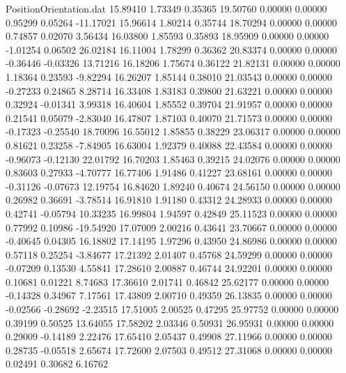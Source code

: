 \begin{filecontents}{PositionOrientation.dat}
  15.89410    1.73349    0.35365    19.50760    0.00000    0.00000    0.95299    0.05264  -11.17021
  15.96614    1.80214    0.35744    18.70294    0.00000    0.00000    0.74857    0.02070    3.56434
  16.03800    1.85593    0.35893    18.95909    0.00000    0.00000   -1.01254    0.06502   26.02184
  16.11004    1.78299    0.36362    20.83374    0.00000    0.00000   -0.36446   -0.03326   13.71216
  16.18206    1.75674    0.36122    21.82131    0.00000    0.00000    1.18364    0.23593   -9.82294
  16.26207    1.85144    0.38010    21.03543    0.00000    0.00000   -0.27233    0.24865    8.28714
  16.33408    1.83183    0.39800    21.63221    0.00000    0.00000    0.32924   -0.01341    3.99318
  16.40604    1.85552    0.39704    21.91957    0.00000    0.00000    0.21541    0.05079   -2.83040
  16.47807    1.87103    0.40070    21.71573    0.00000    0.00000   -0.17323   -0.25540   18.70096
  16.55012    1.85855    0.38229    23.06317    0.00000    0.00000    0.81621    0.23258   -7.84905
  16.63004    1.92379    0.40088    22.43584    0.00000    0.00000   -0.96073   -0.12130   22.01792
  16.70203    1.85463    0.39215    24.02076    0.00000    0.00000    0.83603    0.27933   -4.70777
  16.77406    1.91486    0.41227    23.68161    0.00000    0.00000   -0.31126   -0.07673   12.19754
  16.84620    1.89240    0.40674    24.56150    0.00000    0.00000    0.26982    0.36691   -3.78514
  16.91810    1.91180    0.43312    24.28933    0.00000    0.00000    0.42741   -0.05794   10.33235
  16.99804    1.94597    0.42849    25.11523    0.00000    0.00000    0.77992    0.10986  -19.54920
  17.07009    2.00216    0.43641    23.70667    0.00000    0.00000   -0.40645    0.04305   16.18802
  17.14195    1.97296    0.43950    24.86986    0.00000    0.00000    0.57118    0.25254   -3.84677
  17.21392    2.01407    0.45768    24.59299    0.00000    0.00000   -0.07209    0.13530    4.55841
  17.28610    2.00887    0.46744    24.92201    0.00000    0.00000    0.10681    0.01221    8.74683
  17.36610    2.01741    0.46842    25.62177    0.00000    0.00000   -0.14328    0.34967    7.17561
  17.43809    2.00710    0.49359    26.13835    0.00000    0.00000   -0.02566   -0.28692   -2.23515
  17.51005    2.00525    0.47295    25.97752    0.00000    0.00000    0.39199    0.50525   13.64055
  17.58202    2.03346    0.50931    26.95931    0.00000    0.00000    0.29009   -0.14189    2.22476
  17.65410    2.05437    0.49908    27.11966    0.00000    0.00000    0.28735   -0.05518    2.65674
  17.72600    2.07503    0.49512    27.31068    0.00000    0.00000    0.02491    0.30682    6.16762

\end{filecontents}
